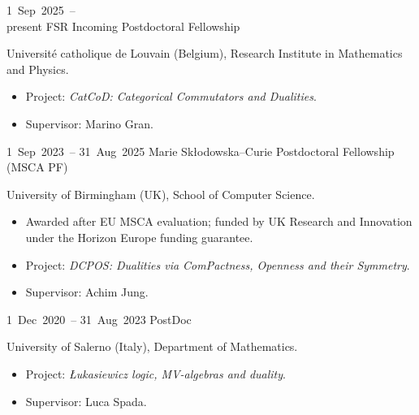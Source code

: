 

\chronorow
  {1~Sep~2025~--\\present}
  {FSR Incoming Postdoctoral Fellowship}
  {\textcolor{secondary}{Université catholique de Louvain (Belgium), Research Institute in Mathematics and
   Physics.}
   \begin{itemize}
     \item Project: \emph{CatCoD: Categorical Commutators and Dualities}.
     \item Supervisor: Marino Gran.
   \end{itemize}}

\chronorow
  {1~Sep~2023~--\allowbreak{} 31~Aug~2025}
  {Marie Skłodowska--Curie Postdoctoral Fellowship (MSCA PF)}
  {\textcolor{secondary}{University of Birmingham (UK), School of Computer Science.}
   \begin{itemize}
     \item Awarded after EU MSCA evaluation; funded by UK Research and Innovation under the Horizon Europe
       funding guarantee.
     \item Project: \emph{DCPOS: Dualities via ComPactness, Openness and their Symmetry}.
     \item Supervisor: Achim Jung.
   \end{itemize}}

\chronorow
  {1~Dec~2020~--\allowbreak{} 31~Aug~2023}
  {PostDoc}
  {\textcolor{secondary}{University of Salerno (Italy), Department of Mathematics.}
   \begin{itemize}
     \item {Project: \emph{{\L}ukasiewicz logic, MV-algebras and duality}.}
     \item Supervisor: Luca Spada.
   \end{itemize}}

